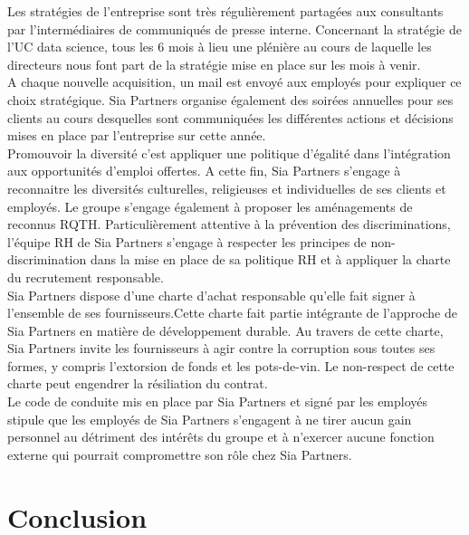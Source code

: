 \documentclass{article} %
\begin{document}
Les stratégies de l’entreprise sont très régulièrement partagées aux consultants par l’intermédiaires de communiqués de presse interne. Concernant la stratégie de l’UC data science, tous les 6 mois à lieu une plénière au cours de laquelle les directeurs nous font part de la stratégie mise en place sur les mois à venir.\\

A chaque nouvelle acquisition, un mail est envoyé aux employés pour expliquer ce choix stratégique. Sia Partners organise également des soirées annuelles pour ses clients au cours desquelles sont communiquées les différentes actions et décisions mises en place par l’entreprise sur cette année.\\

Promouvoir la diversité c’est appliquer une politique d’égalité dans l’intégration aux opportunités d’emploi offertes. A cette fin, Sia Partners s’engage à reconnaitre les diversités culturelles, religieuses et individuelles de ses clients et employés. Le groupe s’engage également à proposer les aménagements de reconnus RQTH. Particulièrement attentive à la prévention des discriminations, l’équipe RH de Sia Partners s’engage à respecter les principes de non-discrimination dans la mise en place de sa politique RH et à appliquer la charte du recrutement responsable.\\

Sia Partners dispose d’une charte d’achat responsable qu’elle fait signer à l’ensemble de ses fournisseurs.Cette charte fait partie intégrante de l’approche de Sia Partners en matière de développement durable. Au travers de cette charte, Sia Partners invite les fournisseurs à agir contre la corruption sous toutes ses formes, y compris l’extorsion de fonds et les pots-de-vin. Le non-respect de cette charte peut engendrer la résiliation du contrat.\\

Le code de conduite mis en place par Sia Partners et signé par les employés stipule que les employés de Sia Partners s’engagent à ne tirer aucun gain personnel au détriment des intérêts du groupe et à n’exercer aucune fonction externe qui pourrait compromettre son rôle chez Sia Partners.


\newpage

\section{Conclusion}
\end{document}
